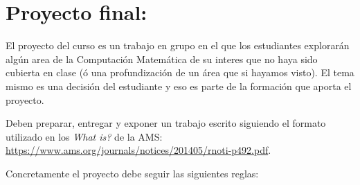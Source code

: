 \documentclass[11pt]{article}
\date{}
\begin{document}
\section*{Proyecto final:}
El proyecto del curso es un trabajo en grupo en el que los estudiantes explorarán algún area de la Computación Matemática de su interes que no haya sido cubierta en clase (ó una profundización de un área que si hayamos visto). El tema mismo es una decisión del estudiante y eso es parte de la formación que aporta el proyecto.

Deben preparar, entregar y exponer un trabajo escrito siguiendo el formato utilizado en los \textit{What is?} de la AMS: \url{https://www.ams.org/journals/notices/201405/rnoti-p492.pdf}.

Concretamente el proyecto debe seguir las siguientes reglas:
\end{document}
